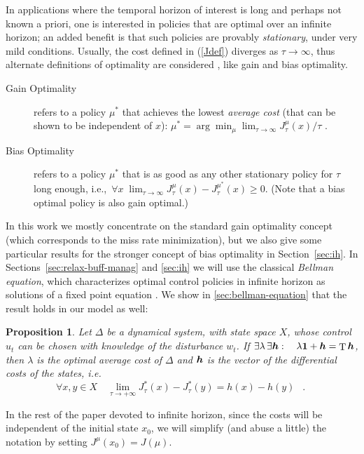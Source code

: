 \documentclass[11pt,a4paper]{article}
\DeclareMathOperator{\T}{T}
\DeclareMathOperator{\mf}{\enspace .}
\newtheorem{proposition}{Proposition}
\theoremstyle{definition}
\theoremstyle{remark}
\def\vec#1{\mathchoice{\mbox{\boldmath$\displaystyle#1$}}
  {\mbox{\boldmath$\textstyle#1$}}
  {\mbox{\boldmath$\scriptstyle#1$}}
  {\mbox{\boldmath$\scriptscriptstyle#1$}}}
\begin{document}
In applications where the temporal horizon of interest is long and perhaps not
known a priori, one is interested in policies that are optimal over an infinite
horizon; an added benefit is that such policies are provably \emph{stationary},
under very mild conditions.  Usually, the cost defined in (\ref{Jdef}) diverges
as $\tau \rightarrow \infty$, thus alternate definitions of optimality are
considered \cite{Bertsekas00,LewisP02,ArapostathisBFGM93,blackwell1962discrete},
like gain and bias optimality.
\begin{description}
\item[Gain Optimality] refers to a policy $\mu^*$ that achieves the lowest \emph{
    average cost} (that can be shown to be independent of $x$): $\mu^*= \arg
  \min_\mu \lim_{\tau\rightarrow\infty} {J^\mu_\tau(x)}/{\tau}$ .
\item[Bias Optimality] refers to a policy $\mu^*$ that is as good as any other
  stationary policy for $\tau$ long enough, i.e.,\ $\forall
  x\;\lim_{\tau\rightarrow\infty} J^\mu_\tau(x) - J^{\mu^*}_\tau(x)\geq
  0$. (Note that a bias optimal policy is also gain optimal.)
\end{description}

In this work we mostly concentrate on the standard gain optimality concept
(which corresponds to the miss rate minimization), but we also give some
particular results for the stronger concept of bias optimality in
Section~\ref{sec:ih}.  In Sections~\ref{sec:relax-buff-manag} and \ref{sec:ih}
we will use the classical \emph{Bellman equation}, which characterizes optimal
control policies in infinite horizon as solutions of a fixed point equation
\cite{Bertsekas00}. We show in \ref{sec:bellman-equation} that the result holds
in our model as well:
\begin{proposition}\label{bel}
  Let $\Delta$ be a dynamical system, with state space $X$, whose control $u_t$
  can be chosen with knowledge of the disturbance $w_t$. If
     $\exists \lambda \, \exists \vec h :\quad \lambda \vec 1 + \vec h = \T \vec h$,     then $\lambda$ is the \emph{optimal average cost} of $\Delta$ and
  $\vec h$ is the vector of the \emph{differential costs} of the
  states, i.e.
  \begin{equation}
    \forall x,y \in X \quad \lim_{\tau\rightarrow +\infty} J_\tau^*(x)-J_\tau^*(y)=h(x)-h(y)\mf
  \end{equation}
\end{proposition}
In the rest of the paper devoted to infinite horizon, since the costs will be
independent of the initial state $x_0$, we will simplify (and abuse a little)
the notation by setting $J^\mu(x_0)=J(\mu)$.
\end{document}
